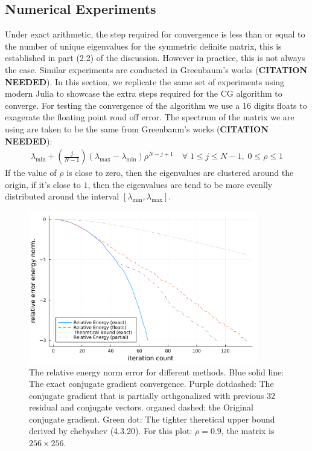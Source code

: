 \documentclass[]{article}
\theoremstyle{definition}
\begin{document}
    \subsection{Numerical Experiments}
        Under exact arithmetic, the step required for convergence is less than or equal to the number of unique eigenvalues for the symmetric definite matrix, this is established in part (2.2) of the discussion. However in practice, this is not always the case. Similar experiments are conducted in Greenbaum's works (\textbf{CITATION NEEDED}). In this section, we replicate the same set of experiments using modern Julia to showcase the extra steps required for the CG algorithm to converge. For testing the convergence of the algorithm we use a 16 digits floats to exagerate the floating point roud off error. The spectrum of the matrix we are using are taken to be the same from Greenbaum's works (\textbf{CITATION NEEDED}): 
        \begin{align}
            \lambda_{\min} + \left(
                \frac{j}{N - 1}
            \right)(\lambda_{\max} - \lambda_{\min})\rho^{N - j + 1}\quad \forall\; 1 \le j \le N - 1, \; 0 \le \rho \le 1
        \end{align}
        If the value of $\rho$ is close to zero, then the eigenvalues are clustered around the origin, if it's close to $1$, then the eigenvalues are tend to be more evenlly distributed around the interval $[\lambda_{\min}, \lambda_{\max}]$. 
        \begin{figure}[h]\label{fig:1}
            \centering
            \includegraphics[width=10cm]{fig1.png}
            \caption{
                The relative energy norm error for different methods. Blue solid line: The exact conjugate gradient convergence. Purple dotdashed: The conjugate gradient that is partially orthgonalized with previous 32 residual and conjugate vectors. organed dashed: the Original conjugate gradient. Green dot: The tighter theretical upper bound derived by chebyshev (4.3.20). For this plot: $\rho = 0.9$, the matrix is $256\times 256$. 
            }
        \end{figure}
\end{document}
